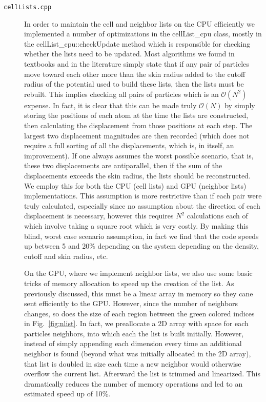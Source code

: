 \documentclass[12pt]{article}
\begin{document}
\begin{description}

\item[\texttt{cellLists.cpp}] In order to maintain the cell and neighbor lists on the CPU efficiently we implemented a number of optimizations in the cellList\_cpu class, mostly in the cellList\_cpu::checkUpdate method which is responsible for checking whether the lists need to be updated.  Most algorithms we found in textbooks and in the literature simply state that if any pair of particles move toward each other more than the skin radius added to the cutoff radius of the potential used to build these lists, then the lists must be rebuilt.  This implies checking all pairs of particles which is an $\mathcal{O}(N^2)$ expense.  In fact, it is clear that this can be made truly $\mathcal{O}(N)$ by simply storing the positions of each atom at the time the lists are constructed, then calculating the displacement from those positions at each step. The largest two displacement magnitudes are then recorded (which does not require a full sorting of all the displacements, which is, in itself, an improvement). If one always assumes the worst possible scenario, that is, these two displacements are antiparallel, then if the sum of the displacements exceeds the skin radius, the lists should be reconstructed.  We employ this for both the CPU (cell lists) and GPU (neighbor lists) implementations.  This assumption is more restrictive than if each pair were truly calculated, especially since no assumption about the direction of each displacement is necessary, however this requires $N^2$ calculations each of which involve taking a square root which is very costly.  By making this blind, worst case scenario assumption, in fact we find that the code speeds up between 5 and 20\% depending on the system depending on the density, cutoff and skin radius, etc.

On the GPU, where we implement neighbor lists, we also use some basic tricks of memory allocation to speed up the creation of the list.  As previously discussed, this must be a linear array in memory so they cane sent efficiently to the GPU.  However, since the number of neighbors changes, so does the size of each region between the green colored indices in Fig.~\ref{fig:nlist}. In fact, we preallocate a 2D array with space for each particles neighbors, into which each the list is built initially.  However, instead of simply appending each dimension every time an additional neighbor is found (beyond what was initially allocated in the 2D array), that list is doubled in size each time a new neighbor would otherwise overflow the current list.  Afterward the list is trimmed and linearized.  This dramatically reduces the number of memory operations and led to an estimated speed up of 10\%.


\end{description}
\end{document}
